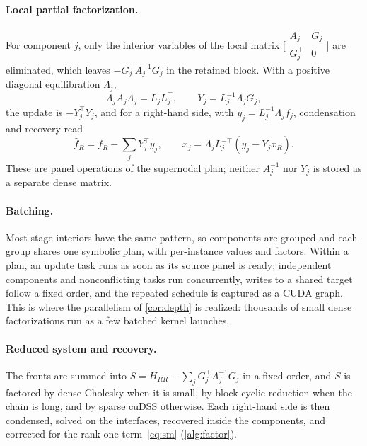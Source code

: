 \paragraph{Local partial factorization.}
For component $j$, only the interior variables of the local matrix
$\bigl[\begin{smallmatrix}A_j&G_j\\G_j^\top&0\end{smallmatrix}\bigr]$
are eliminated, which leaves $-G_j^\top A_j^{-1}G_j$ in the retained block. With a
positive diagonal equilibration $\Lambda_j$,
\begin{equation}\label{eq:local-factor}
\Lambda_jA_j\Lambda_j=L_jL_j^\top,\qquad Y_j=L_j^{-1}\Lambda_jG_j,
\end{equation}
the update is $-Y_j^\top Y_j$, and for a right-hand side, with
$y_j=L_j^{-1}\Lambda_jf_j$, condensation and recovery read
\begin{equation}\label{eq:local-solve}
\widehat f_R=f_R-\sum_jY_j^\top y_j,\qquad x_j=\Lambda_jL_j^{-\top}(y_j-Y_jx_R).
\end{equation}
These are panel operations of the supernodal plan; neither $A_j^{-1}$ nor $Y_j$ is
stored as a separate dense matrix.

\paragraph{Batching.}
Most stage interiors have the same pattern, so components are grouped and each
group shares one symbolic plan, with per-instance values and factors. Within a
plan, an update task runs as soon as its source panel is ready; independent
components and nonconflicting tasks run concurrently, writes to a shared target
follow a fixed order, and the repeated schedule is captured as a CUDA graph. This
is where the parallelism of \cref{cor:depth} is realized: thousands of small dense
factorizations run as a few batched kernel launches.

\paragraph{Reduced system and recovery.}
The fronts are summed into $S=H_{RR}-\sum_jG_j^\top A_j^{-1}G_j$ in a fixed order,
and $S$ is factored by dense Cholesky when it is small, by block cyclic reduction
when the chain is long, and by sparse cuDSS otherwise. Each right-hand side is
then condensed, solved on the interfaces, recovered inside the components, and
corrected for the rank-one term~\eqref{eq:sm} (\cref{alg:factor}).

